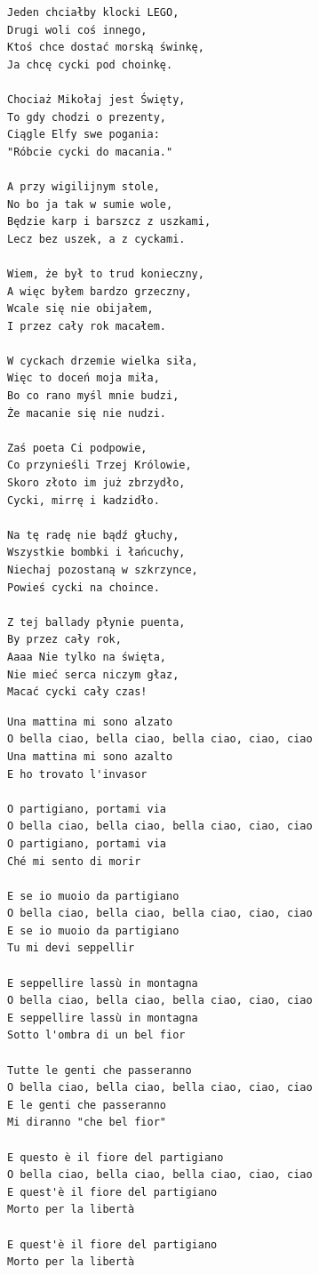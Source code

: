 \documentclass[12pt]{article}
\begin{document}
\begin{verbatim}
Jeden chciałby klocki LEGO,
Drugi woli coś innego,
Ktoś chce dostać morską świnkę,
Ja chcę cycki pod choinkę.

Chociaż Mikołaj jest Święty,
To gdy chodzi o prezenty,
Ciągle Elfy swe pogania:
"Róbcie cycki do macania."

A przy wigilijnym stole,
No bo ja tak w sumie wole,
Będzie karp i barszcz z uszkami,
Lecz bez uszek, a z cyckami.

Wiem, że był to trud konieczny,
A więc byłem bardzo grzeczny,
Wcale się nie obijałem,
I przez cały rok macałem.

W cyckach drzemie wielka siła,
Więc to doceń moja miła,
Bo co rano myśl mnie budzi,
Że macanie się nie nudzi.

Zaś poeta Ci podpowie,
Co przynieśli Trzej Królowie,
Skoro złoto im już zbrzydło,
Cycki, mirrę i kadzidło.

Na tę radę nie bądź głuchy,
Wszystkie bombki i łańcuchy,
Niechaj pozostaną w szkrzynce,
Powieś cycki na choince.

Z tej ballady płynie puenta,
By przez cały rok,
Aaaa Nie tylko na święta,
Nie mieć serca niczym głaz,
Macać cycki cały czas!
\end{verbatim}
\clearpage

\begin{verbatim}
Una mattina mi sono alzato
O bella ciao, bella ciao, bella ciao, ciao, ciao
Una mattina mi sono azalto
E ho trovato l'invasor

O partigiano, portami via
O bella ciao, bella ciao, bella ciao, ciao, ciao
O partigiano, portami via
Ché mi sento di morir

E se io muoio da partigiano
O bella ciao, bella ciao, bella ciao, ciao, ciao
E se io muoio da partigiano
Tu mi devi seppellir

E seppellire lassù in montagna
O bella ciao, bella ciao, bella ciao, ciao, ciao
E seppellire lassù in montagna
Sotto l'ombra di un bel fior

Tutte le genti che passeranno
O bella ciao, bella ciao, bella ciao, ciao, ciao
E le genti che passeranno
Mi diranno "che bel fior"

E questo è il fiore del partigiano
O bella ciao, bella ciao, bella ciao, ciao, ciao
E quest'è il fiore del partigiano
Morto per la libertà

E quest'è il fiore del partigiano
Morto per la libertà
\end{verbatim}
\clearpage
\end{document}
